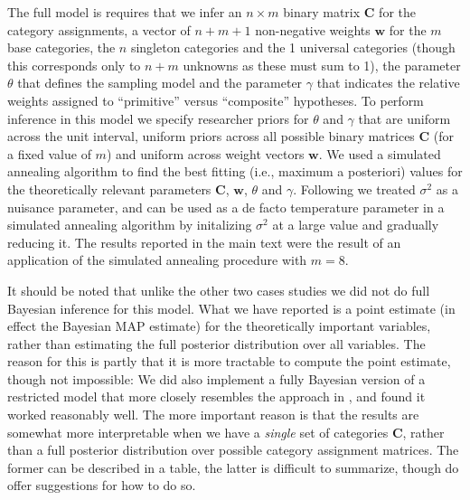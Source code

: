 \documentclass[doc,floatsintext]{apa6}
\begin{document}
The full model is requires that we infer an $n \times m$ binary matrix $\mathbf{C}$ for the category assignments, a vector of $n+m+1$ non-negative weights $\mathbf{w}$ for the $m$ base categories, the $n$ singleton categories and the 1 universal categories (though this corresponds only to $n+m$ unknowns as these must sum to 1), the parameter $\theta$ that defines the sampling model and the parameter $\gamma$ that indicates the relative weights assigned to ``primitive'' versus ``composite'' hypotheses. To perform inference in this model we specify researcher priors for $\theta$ and $\gamma$ that are uniform across the unit interval, uniform priors across all possible binary matrices $\mathbf{C}$ (for a fixed value of $m$) and uniform across weight vectors $\mathbf{w}$. We used a simulated annealing algorithm to find the best fitting (i.e., maximum a posteriori) values for the theoretically relevant parameters $\mathbf{C}$, $\mathbf{w}$, $\theta$ and $\gamma$. Following  we treated $\sigma^2$ as a nuisance parameter, and can be used as a de facto temperature parameter in a simulated annealing algorithm by initalizing $\sigma^2$ at a large value and gradually reducing it. The results reported in the main text were the result of an application of the simulated annealing procedure with $m=8$.

It should be noted that unlike the other two cases studies we did not do full Bayesian inference for this model. What we have reported is a point estimate (in effect the Bayesian MAP estimate) for the theoretically important variables, rather than estimating the full posterior distribution over all variables. The reason for this is partly that it is more tractable to compute the point estimate, though not impossible: We did also implement a fully Bayesian version of a restricted model that more closely resembles the approach in , and found it worked reasonably well. The more important reason is that the results are somewhat more interpretable when we have a {\it single} set of categories $\mathbf{C}$, rather than a full posterior distribution over possible category assignment matrices. The former can be described in a table, the latter is difficult to summarize, though  do offer suggestions for how to do so.
\end{document}
